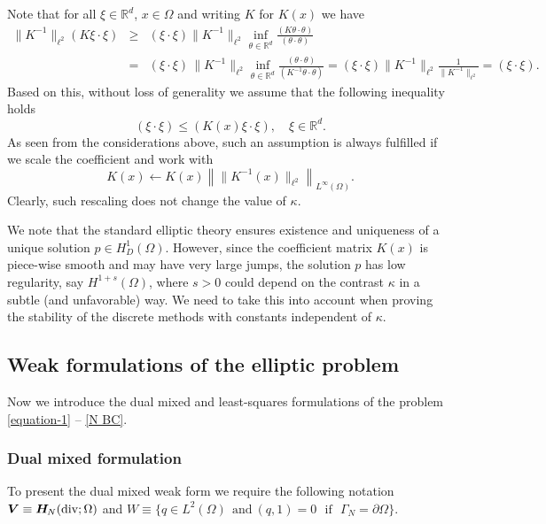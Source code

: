 \documentclass[11pt]{amsart}
\numberwithin{equation}{section}
\theoremstyle{definition}\newtheorem{example}{Example}[section]
\begin{document}
Note that for  all $\xi\in\mathbb{R}^d$, $x\in \Omega$ and writing $K$
for $K(x)$ we have
\begin{eqnarray*}
\|K^{-1}\|_{\ell^2}(K\xi\cdot\xi)& \ge &
(\xi\cdot\xi)\|K^{-1}\|_{\ell^2}
\inf_{\theta\in \mathbb{R}^d}\frac{(K\theta\cdot \theta)}{(\theta\cdot\theta)}\\
&= &
(\xi\cdot\xi) \, \|K^{-1}\|_{\ell^2}
\inf_{\theta\in
  \mathbb{R}^d}\frac{(\theta\cdot\theta)}{(K^{-1}\theta\cdot\theta)}
=
(\xi\cdot\xi)\|K^{-1}\|_{\ell^2}\frac{1}{\|K^{-1}\|_{\ell^2}}=(\xi\cdot\xi).
\end{eqnarray*}
Based on this, without loss of generality we assume that 
the following inequality holds
\begin{equation}\label{bound_below_K}
(\xi\cdot \xi) \le  (K(x)\xi\cdot\xi), \quad \xi\in \mathbb{R}^d.   
\end{equation}  
As seen from the considerations above, such an assumption is always
fulfilled if we scale the coefficient and work with
\[
K(x)\leftarrow 
K(x)\left\|\|K^{-1}(x)\|_{\ell^2}\right\|_{L^{\infty}(\Omega)}. 
\] 
Clearly, such rescaling does not change the value of $\kappa$. 

We note that the standard elliptic theory ensures existence and
uniqueness of a unique solution $p \in H^1_D({{\Omega}})$. However, since the
coefficient matrix $K(x)$ is piece-wise smooth and may have very large
jumps, the solution $p$ has low regularity, say $H^{1+s}({{\Omega}})$,
where $s>0$ could depend on the contrast $\kappa$ in a subtle (and 
unfavorable) way. We need to take this into account when proving the
stability of the discrete methods with constants independent of
$\kappa$.

\subsection{Weak formulations of the elliptic problem}\label{s:weak}

Now we introduce the dual mixed and least-squares formulations of the 
problem \eqref{equation-1} -- \eqref{N BC}.

\subsubsection{Dual mixed formulation}\label{ss:dual_form}
To present the dual mixed weak form we require the following notation 
$
{{\boldsymbol V}} \equiv {{\boldsymbol H}_{\hspace{-0.2mm}N}}({\operatorname{div}};\Omega)$ 
and 
$
W \equiv \{ q \in L^2(\Omega) ~~\text{and} ~(q,1)=0  ~~~\text{if} ~~~ \Gamma_N=\partial \Omega \}.
$
\end{document}
